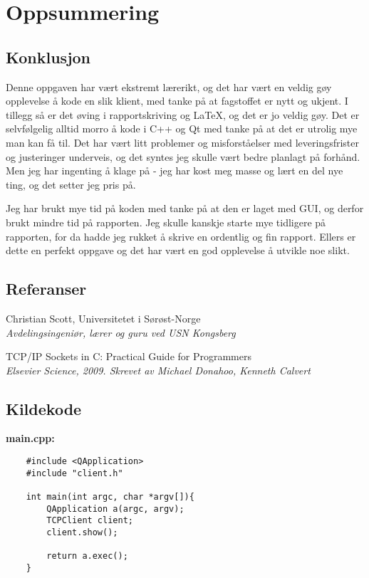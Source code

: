 \section{Oppsummering}
\subsection{Konklusjon}
Denne oppgaven har vært ekstremt lærerikt, og det har vært en veldig gøy opplevelse å kode en slik klient, med tanke på at fagstoffet er nytt og ukjent. I tillegg så er det øving i rapportskriving og LaTeX, og det er jo veldig gøy. Det er selvfølgelig alltid morro å kode i C++ og Qt med tanke på at det er utrolig mye man kan få til. Det har vært litt problemer og misforståelser med leveringsfrister og justeringer underveis, og det syntes jeg skulle vært bedre planlagt på forhånd. Men jeg har ingenting å klage på - jeg har kost meg masse og lært en del nye ting, og det setter jeg pris på.

Jeg har brukt mye tid på koden med tanke på at den er laget med GUI, og derfor brukt mindre tid på rapporten. Jeg skulle kanskje starte mye tidligere på rapporten, for da hadde jeg rukket å skrive en ordentlig og fin rapport. Ellers er dette en perfekt oppgave og det har vært en god opplevelse å utvikle noe slikt.

\subsection{Referanser}
\renewcommand{\section}[2]{}
\begin{thebibliography}{50}
		Christian Scott, Universitetet i Sørøst-Norge\\
		\textit{Avdelingsingeniør, lærer og guru ved USN Kongsberg}

		TCP/IP Sockets in C: Practical Guide for Programmers\\
		\textit{Elsevier Science, 2009. Skrevet av Michael Donahoo, Kenneth Calvert}
\end{thebibliography}

\newpage
\subsection{Kildekode}
\textbf{main.cpp:}
\begin{lstlisting}
	#include <QApplication>
	#include "client.h"

	int main(int argc, char *argv[]){
		QApplication a(argc, argv);
		TCPClient client;
		client.show();

		return a.exec();
	}
\end{lstlisting}

